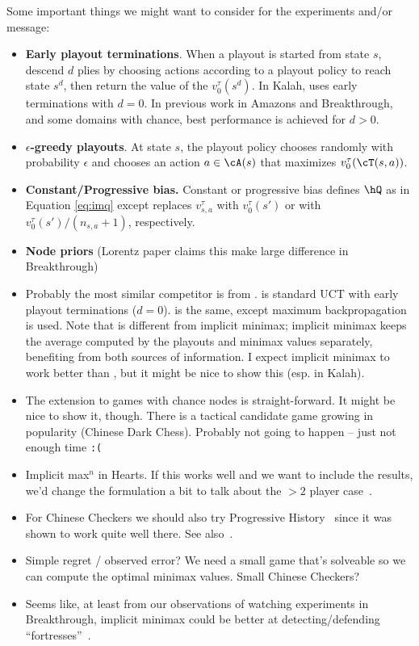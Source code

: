 
Some important things we might want to consider for the experiments and/or message:
\begin{itemize}
\item {\bf Early playout terminations}. When a playout is started from state $s$, descend $d$ plies by 
      choosing actions according to a playout policy to reach state $s^d$, then return the value 
      of the $v^{\tau}_0(s^d)$. In Kalah, \UCTH uses early terminations with $d = 0$. 
      In previous work in Amazons and Breakthrough, and some domains with chance, 
      best performance is achieved for $d > 0$. 
\item {\bf $\epsilon$-greedy playouts}. 
      At state $s$, the playout policy chooses randomly with 
      probability $\epsilon$ and chooses an action $a \in \cA(s)$ that maximizes $v_0^\tau(\cT(s,a))$. 
\item {\bf Constant/Progressive bias.} Constant or progressive bias defines $\hQ$ as in Equation \ref{eq:imq} 
      except replaces $v^{\tau}_{s,a}$ with $v^{\tau}_0(s')$ or with $v^{\tau}_0(s') / (n_{s,a} + 1)$, respectively. 
\item {\bf Node priors} (Lorentz paper claims this make large difference in Breakthrough)
\item Probably the most similar competitor is \UCTMAXH from \cite{Ramanujan11Tradeoffs}. \UCTH
      is standard UCT with early playout terminations ($d = 0$). \UCTMAXH is the same, except maximum backpropagation
      is used. Note that \UCTMAXH is different from implicit minimax; implicit minimax keeps the average computed by 
      the playouts and minimax values separately, benefiting from both sources of information. I expect implicit minimax
      to work better than \UCTMAXH, but it might be nice to show this (esp. in Kalah). 
\item The extension to games with chance nodes is straight-forward. It might be nice to show it, though. There is a tactical 
      candidate game growing in popularity (Chinese Dark Chess). Probably not going to happen -- just not enough time {\tt :(}
\item Implicit max$^n$ in Hearts. If this works well and we want to include the results, we'd 
      change the formulation a bit to talk about the $>2$ player case~\cite{Sturtevant08An}. 
\item For Chinese Checkers we should also try Progressive History~\cite{Nijssen10Enhancements,Nijssen13PhdThesis} since it was 
      shown to work quite well there. See also~\cite{Roschke13UCT}.
\item Simple regret / observed error? We need a small game that's solveable so we can compute the optimal minimax values.
      Small Chinese Checkers?
\item Seems like, at least from our observations of watching experiments in Breakthrough, implicit minimax could be better at 
      detecting/defending ``fortresses''~\cite{Guid12Fortress}. 
\end{itemize}
